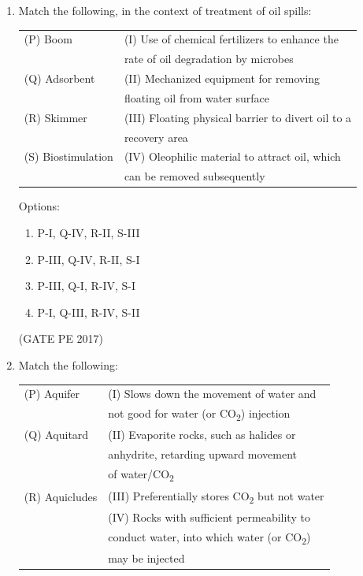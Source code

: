 \documentclass[journal,12pt,onecolumn]{IEEEtran}
\theoremstyle{remark}
\begin{document}
\begin{enumerate}[start=1, label={Q\arabic*.}]
\item Match the following, in the context of treatment of oil spills:\\

\begin{tabular}{ll}
(P) Boom          & (I) Use of chemical fertilizers to enhance the \\
                  & \hfill rate of oil degradation by microbes \\
(Q) Adsorbent     & (II) Mechanized equipment for removing \\
                  & \hfill floating oil from water surface \\
(R) Skimmer       & (III) Floating physical barrier to divert oil to a \\
                  & \hfill recovery area \\
(S) Biostimulation & (IV) Oleophilic material to attract oil, which \\
                  & \hfill can be removed subsequently \\
\end{tabular}
Options:
\begin{enumerate}
\item P-I, Q-IV, R-II, S-III  
\item P-III, Q-IV, R-II, S-I  
\item P-III, Q-I, R-IV, S-I  
\item P-I, Q-III, R-IV, S-II  
\end{enumerate}
\hfill{(GATE PE 2017)}

\item Match the following:\\

\begin{tabular}{ll}
(P) Aquifer     & (I) Slows down the movement of water and \\
                & \hfill not good for water (or CO\textsubscript{2}) injection \\
(Q) Aquitard    & (II) Evaporite rocks, such as halides or \\
                & \hfill anhydrite, retarding upward movement \\
                & \hfill of water/CO\textsubscript{2} \\
(R) Aquicludes  & (III) Preferentially stores CO\textsubscript{2} but not water \\
                & (IV) Rocks with sufficient permeability to \\
                & \hfill conduct water, into which water (or CO\textsubscript{2}) \\
                & \hfill may be injected \\
\end{tabular}


\end{enumerate}
\end{document}
